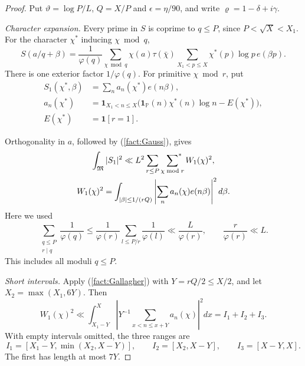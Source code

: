\documentclass{amsart}
\newcounter{fact}
\numberwithin{equation}{section}
\numberwithin{table}{section}
\newcommand{\PP}{\mathbb P}
\newcommand{\ind}{\mathbf 1}
\newcommand{\M}{\mathfrak M}
\newcommand{\sums}{\sideset{}{^*}\sum}
\begin{document}
\begin{proof}
Put $\vartheta=\log P/L$, $Q=X/P$ and $\epsilon=\eta/90$, and write
$\varrho=1-\delta+i\gamma$.

\noindent\textit{Character expansion.}
Every prime in $S$ is coprime to $q\le P$, since $P<\sqrt X<X_1$.
For the character $\chi^*$ inducing $\chi\bmod q$,
\[
S(a/q+\beta)=\frac1{\varphi(q)}\sum_{\chi\bmod q}
\chi(a)\tau(\bar\chi)
\sum_{X_1<p\le X}\chi^*(p)\log p\,e(\beta p).
\]
There is one exterior factor $1/\varphi(q)$. For primitive $\chi\bmod r$, put
\[
\begin{aligned}
S_1(\chi^*,\beta)&=\sum_n a_n(\chi^*)e(n\beta),\\
a_n(\chi^*)&=\ind_{X_1<n\le X}
\bigl(\ind_{\PP}(n)\chi^*(n)\log n-E(\chi^*)\bigr),\\
E(\chi^*)&=\ind[r=1].
\end{aligned}
\]

Orthogonality in $a$, followed by (\ref{fact:Gauss}), gives
\begin{equation}\label{eq:character-mean-square}
\begin{gathered}
\int_\M|S_1|^2\ll L^2\sum_{r\le P}\;\sums_{\chi\bmod r}W_1(\chi)^2,
\\
W_1(\chi)^2=\int_{|\beta|\le1/(rQ)}
\left|\sum_na_n(\chi)e(n\beta)\right|^2d\beta.
\end{gathered}
\end{equation}
Here we used
\[
\sum_{\substack{q\le P\\r\mid q}}\frac1{\varphi(q)}
\le \frac1{\varphi(r)}\sum_{l\le P/r}\frac1{\varphi(l)}
\ll \frac L{\varphi(r)},
\qquad \frac r{\varphi(r)}\ll L.
\]
This includes all moduli $q\le P$.

\noindent\textit{Short intervals.}
Apply (\ref{fact:Gallagher}) with $Y=rQ/2\le X/2$, and let
$X_2=\max(X_1,6Y)$. Then
\begin{equation}\label{eq:Gallagher-ranges}
W_1(\chi)^2\ll\int_{X_1-Y}^X
\left|Y^{-1}\sum_{x<n\le x+Y}a_n(\chi)\right|^2dx
=I_1+I_2+I_3.
\end{equation}
With empty intervals omitted, the three ranges are
\[
I_1=[X_1-Y,\min(X_2,X-Y)],\qquad
I_2=[X_2,X-Y],\qquad
I_3=[X-Y,X].
\]
The first has length at most $7Y$.


\end{proof}
\end{document}
